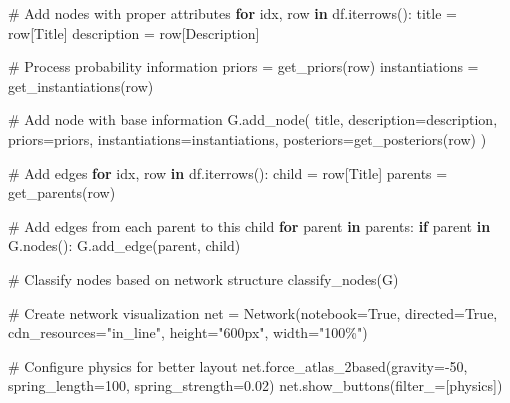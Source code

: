 \documentclass[
  11pt,
  letterpaper,
  openany]{book}
\newenvironment{Shaded}{\begin{snugshade}}{\end{snugshade}}
\newcommand{\CommentTok}[1]{\textcolor[rgb]{0.37,0.37,0.37}{#1}}
\newcommand{\ControlFlowTok}[1]{\textcolor[rgb]{0.00,0.23,0.31}{\textbf{#1}}}
\newcommand{\DecValTok}[1]{\textcolor[rgb]{0.68,0.00,0.00}{#1}}
\newcommand{\FloatTok}[1]{\textcolor[rgb]{0.68,0.00,0.00}{#1}}
\newcommand{\KeywordTok}[1]{\textcolor[rgb]{0.00,0.23,0.31}{\textbf{#1}}}
\newcommand{\NormalTok}[1]{\textcolor[rgb]{0.00,0.23,0.31}{#1}}
\newcommand{\OperatorTok}[1]{\textcolor[rgb]{0.37,0.37,0.37}{#1}}
\newcommand{\StringTok}[1]{\textcolor[rgb]{0.13,0.47,0.30}{#1}}
\newcommand{\VariableTok}[1]{\textcolor[rgb]{0.07,0.07,0.07}{#1}}
\begin{document}
\begin{landscape}
\begin{Shaded}
\begin{Highlighting}[]
    \CommentTok{\# Add nodes with proper attributes}
    \ControlFlowTok{for}\NormalTok{ idx, row }\KeywordTok{in}\NormalTok{ df.iterrows():}
\NormalTok{        title }\OperatorTok{=}\NormalTok{ row[}\StringTok{\textquotesingle{}Title\textquotesingle{}}\NormalTok{]}
\NormalTok{        description }\OperatorTok{=}\NormalTok{ row[}\StringTok{\textquotesingle{}Description\textquotesingle{}}\NormalTok{]}

        \CommentTok{\# Process probability information}
\NormalTok{        priors }\OperatorTok{=}\NormalTok{ get\_priors(row)}
\NormalTok{        instantiations }\OperatorTok{=}\NormalTok{ get\_instantiations(row)}

        \CommentTok{\# Add node with base information}
\NormalTok{        G.add\_node(}
\NormalTok{            title,}
\NormalTok{            description}\OperatorTok{=}\NormalTok{description,}
\NormalTok{            priors}\OperatorTok{=}\NormalTok{priors,}
\NormalTok{            instantiations}\OperatorTok{=}\NormalTok{instantiations,}
\NormalTok{            posteriors}\OperatorTok{=}\NormalTok{get\_posteriors(row)}
\NormalTok{        )}

    \CommentTok{\# Add edges}
    \ControlFlowTok{for}\NormalTok{ idx, row }\KeywordTok{in}\NormalTok{ df.iterrows():}
\NormalTok{        child }\OperatorTok{=}\NormalTok{ row[}\StringTok{\textquotesingle{}Title\textquotesingle{}}\NormalTok{]}
\NormalTok{        parents }\OperatorTok{=}\NormalTok{ get\_parents(row)}

        \CommentTok{\# Add edges from each parent to this child}
        \ControlFlowTok{for}\NormalTok{ parent }\KeywordTok{in}\NormalTok{ parents:}
            \ControlFlowTok{if}\NormalTok{ parent }\KeywordTok{in}\NormalTok{ G.nodes():}
\NormalTok{                G.add\_edge(parent, child)}

    \CommentTok{\# Classify nodes based on network structure}
\NormalTok{    classify\_nodes(G)}

    \CommentTok{\# Create network visualization}
\NormalTok{    net }\OperatorTok{=}\NormalTok{ Network(notebook}\OperatorTok{=}\VariableTok{True}\NormalTok{, directed}\OperatorTok{=}\VariableTok{True}\NormalTok{, cdn\_resources}\OperatorTok{=}\StringTok{"in\_line"}\NormalTok{, height}\OperatorTok{=}\StringTok{"600px"}\NormalTok{, width}\OperatorTok{=}\StringTok{"100\%"}\NormalTok{)}

    \CommentTok{\# Configure physics for better layout}
\NormalTok{    net.force\_atlas\_2based(gravity}\OperatorTok{={-}}\DecValTok{50}\NormalTok{, spring\_length}\OperatorTok{=}\DecValTok{100}\NormalTok{, spring\_strength}\OperatorTok{=}\FloatTok{0.02}\NormalTok{)}
\NormalTok{    net.show\_buttons(filter\_}\OperatorTok{=}\NormalTok{[}\StringTok{\textquotesingle{}physics\textquotesingle{}}\NormalTok{])}


\end{Highlighting}
\end{Shaded}
\end{landscape}
\end{document}

